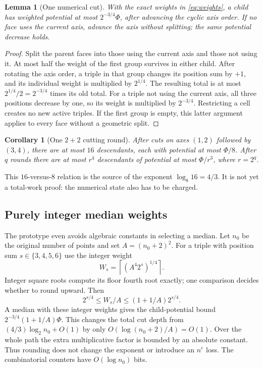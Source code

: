 \documentclass[12pt,a4paper]{article}
\newtheorem{lemma}[theorem]{Lemma}
\newtheorem{corollary}[theorem]{Corollary}
\theoremstyle{remark}
\newcommand{\1}{\mathbf1}
\begin{document}
\begin{lemma}[One numerical cut]\label{lem:cut}
With the exact weights in \eqref{eq:weights}, a child has weighted
potential at most $2^{-3/4}\Phi$, after advancing the cyclic axis order.
If no face uses the current axis, advance the axis without splitting;
the same potential decrease holds.
\end{lemma}
\begin{proof}
Split the parent faces into those using the current axis and those not
using it. At most half the weight of the first group survives in either
child. After rotating the axis order, a triple in that group changes its
position sum by $+1$, and its individual weight is multiplied by $2^{1/4}$.
The resulting total is at most $2^{1/4}/2=2^{-3/4}$ times its old total.
For a triple not using the current axis, all three positions decrease by
one, so its weight is multiplied by $2^{-3/4}$. Restricting a cell creates
no new active triples. If the first group is empty, this latter argument
applies to every face without a geometric split.
\end{proof}

\begin{corollary}[One $2+2$ cutting round]\label{cor:round}
After cuts on axes $(1,2)$ followed by $(3,4)$, there are at most $16$
descendants, each with potential at most $\Phi/8$. After $q$ rounds there
are at most $r^4$ descendants of potential at most $\Phi/r^3$, where $r=2^q$.
\end{corollary}
This $16$-versus-$8$ relation is the source of the exponent
$\log_8 16=4/3$. It is not yet a total-work proof: the numerical state
also has to be charged.

\subsection{Purely integer median weights}
The prototype even avoids algebraic constants in selecting a median.
Let $n_0$ be the original number of points and set $A=(n_0+2)^2$.
For a triple with position sum $s\in\{3,4,5,6\}$ use the integer weight
\[
                 W_s=\left\lceil(A^4 2^s)^{1/4}\right\rceil.
\]
Integer square roots compute its floor fourth root exactly; one comparison
decides whether to round upward. Then
\[
       2^{s/4}\le W_s/A\le (1+1/A)2^{s/4}.
\]
A median with these integer weights gives the child-potential bound
$2^{-3/4}(1+1/A)\Phi$. This changes the total cut depth from
$(4/3)\log_2 n_0+O(1)$ by only $O(\log(n_0+2)/A)=O(1)$.
Over the whole path the extra multiplicative factor is bounded by an
absolute constant. Thus rounding does not change the exponent or introduce
an $n^\varepsilon$ loss. The combinatorial counters have $O(\log n_0)$ bits.
\end{document}
